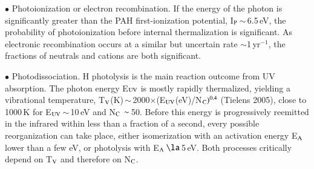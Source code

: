 \documentclass{aa}
\begin{document}
$\bullet$ Photoionization or electron recombination. If the energy of the photon is significantly greater than the PAH first-ionization potential, I$_{\rm P}$\,$\sim$\,6.5\,eV, the probability of photoionization before internal thermalization is significant. As electronic recombination occurs at a similar but uncertain rate $\sim$1\,yr$^{-1}$, the fractions of neutrals and cations are both significant.

$\bullet$ Photodissociation. 
H photolysis is the main reaction outcome from UV  absorption. The photon 
energy E$_{\rm UV}$
is mostly rapidly thermalized, yielding a vibrational temperature, T$_{\rm V}$(K)\,$\sim$\,2000$\times$(E$_{\rm UV}$(eV)/N$_{\rm C})^{0.4}$ (Tielens 2005), close to 1000\,K for E$_{\rm UV}$\,$\sim$\,10\,eV and N$_{\rm C}\,\sim$\,50. Before this energy is progressively reemitted in the infrared within less than a fraction of a second, every possible reorganization can take place, either isomerization with an activation energy E$_{\rm A}$ lower than a few eV, or photolysis with E$_{\rm A}$\,$\la$\,5\,eV.  Both processes critically depend on T$_{\rm V}$ and therefore on N$_{\rm C}$. 
\end{document}
